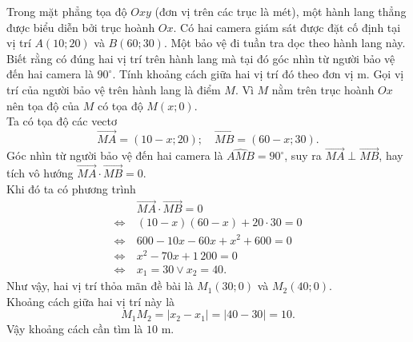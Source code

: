 \begin{ex}%
	Trong mặt phẳng tọa độ $Oxy$ (đơn vị trên các trục là mét), một hành lang thẳng được biểu diễn bởi trục hoành $Ox$. Có hai camera giám sát được đặt cố định tại vị trí $A(10; 20)$ và $B(60; 30)$. Một bảo vệ đi tuần tra dọc theo hành lang này. Biết rằng có đúng hai vị trí trên hành lang mà tại đó góc nhìn từ người bảo vệ đến hai camera là $90^{\circ}$. Tính khoảng cách giữa hai vị trí đó theo đơn vị m.
	\loigiai
	{Gọi vị trí của người bảo vệ trên hành lang là điểm $M$. Vì $M$ nằm trên trục hoành $Ox$ nên tọa độ của $M$ có tọa độ $M(x; 0)$.\\
	Ta có tọa độ các vectơ
	$$ \overrightarrow{MA} = (10 - x; 20); \quad \overrightarrow{MB} = (60 - x; 30). $$
	Góc nhìn từ người bảo vệ đến hai camera là $\widehat{AMB} = 90^{\circ}$, suy ra $\overrightarrow{MA} \perp \overrightarrow{MB}$, hay tích vô hướng $\overrightarrow{MA} \cdot \overrightarrow{MB} = 0$.\\
	Khi đó ta có phương trình
	\begin{align*}
		&\overrightarrow{MA} \cdot \overrightarrow{MB} = 0\\
		\Leftrightarrow\ & (10 - x)(60 - x) + 20 \cdot 30 = 0 \\
		\Leftrightarrow \ & 600 - 10x - 60x + x^2 + 600 = 0 \\
		\Leftrightarrow \ & x^2 - 70x + 1\,200 = 0\\
		\Leftrightarrow \ & x_1 = 30 \vee x_2 = 40.
	\end{align*}
	Như vậy, hai vị trí thỏa mãn đề bài là $M_1(30; 0)$ và $M_2(40; 0)$.\\
	Khoảng cách giữa hai vị trí này là
	$$ M_1M_2 = |x_2 - x_1| = |40 - 30| = 10.$$
	Vậy khoảng cách cần tìm là $10$ m.}
\end{ex}
%